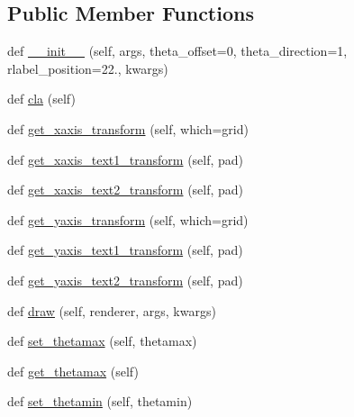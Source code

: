 \subsection*{Public Member Functions}
\begin{DoxyCompactItemize}
\item 
def \hyperlink{classmatplotlib_1_1projections_1_1polar_1_1PolarAxes_a209200eb617cc205d98bab8716a8fe63}{\+\_\+\+\_\+init\+\_\+\+\_\+} (self, args, theta\+\_\+offset=0, theta\+\_\+direction=1, rlabel\+\_\+position=22., kwargs)
\item 
def \hyperlink{classmatplotlib_1_1projections_1_1polar_1_1PolarAxes_ab6af7af6d79ab643260ab6ac6795d2bf}{cla} (self)
\item 
def \hyperlink{classmatplotlib_1_1projections_1_1polar_1_1PolarAxes_aa4d35c03cbff9f1f88dbafebb6c62e03}{get\+\_\+xaxis\+\_\+transform} (self, which=\textquotesingle{}grid\textquotesingle{})
\item 
def \hyperlink{classmatplotlib_1_1projections_1_1polar_1_1PolarAxes_a4e08f0c3a8425a09c7659a3302df4595}{get\+\_\+xaxis\+\_\+text1\+\_\+transform} (self, pad)
\item 
def \hyperlink{classmatplotlib_1_1projections_1_1polar_1_1PolarAxes_a26e244a89deef2ff1977efbf61ff9433}{get\+\_\+xaxis\+\_\+text2\+\_\+transform} (self, pad)
\item 
def \hyperlink{classmatplotlib_1_1projections_1_1polar_1_1PolarAxes_ab6d62cc41bff70657808bed9a914f5da}{get\+\_\+yaxis\+\_\+transform} (self, which=\textquotesingle{}grid\textquotesingle{})
\item 
def \hyperlink{classmatplotlib_1_1projections_1_1polar_1_1PolarAxes_a71e04ac7fd54c71cf02544762db3b7ac}{get\+\_\+yaxis\+\_\+text1\+\_\+transform} (self, pad)
\item 
def \hyperlink{classmatplotlib_1_1projections_1_1polar_1_1PolarAxes_a5a6cbdd676b8975fd4a8e0dd983a2118}{get\+\_\+yaxis\+\_\+text2\+\_\+transform} (self, pad)
\item 
def \hyperlink{classmatplotlib_1_1projections_1_1polar_1_1PolarAxes_ab02fa03ee9c3af729322310b6cc817b1}{draw} (self, renderer, args, kwargs)
\item 
def \hyperlink{classmatplotlib_1_1projections_1_1polar_1_1PolarAxes_ad0f7116006e1c707e7e002c570b7f51a}{set\+\_\+thetamax} (self, thetamax)
\item 
def \hyperlink{classmatplotlib_1_1projections_1_1polar_1_1PolarAxes_ac122a4180329cd7846dad1ba934d072d}{get\+\_\+thetamax} (self)
\item 
def \hyperlink{classmatplotlib_1_1projections_1_1polar_1_1PolarAxes_a8516391e626ee17ac0735a980a8cba71}{set\+\_\+thetamin} (self, thetamin)

\end{DoxyCompactItemize}
